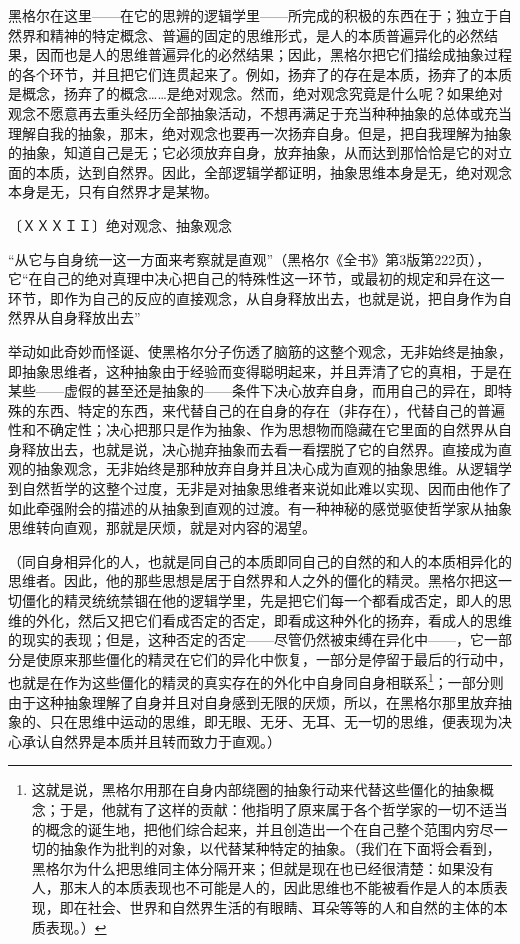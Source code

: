 \documentclass[a4paper,twoside,12pt]{ctexart}
\begin{document}
黑格尔在这里——在它的思辨的逻辑学里——所完成的积极的东西在于；独立于自然界和精神的特定概念、普遍的固定的思维形式，是人的本质普遍异化的必然结果，因而也是人的思维普遍异化的必然结果；因此，黑格尔把它们描绘成抽象过程的各个环节，并且把它们连贯起来了。例如，扬弃了的存在是本质，扬弃了的本质是概念，扬弃了的概念……是绝对观念。然而，绝对观念究竟是什么呢？如果绝对观念不愿意再去重头经历全部抽象活动，不想再满足于充当种种抽象的总体或充当理解自我的抽象，那末，绝对观念也要再一次扬弃自身。但是，把自我理解为抽象的抽象，知道自己是无；它必须放弃自身，放弃抽象，从而达到那恰恰是它的对立面的本质，达到自然界。因此，全部逻辑学都证明，抽象思维本身是无，绝对观念本身是无，只有自然界才是某物。

〔ＸＸＸＩＩ〕绝对观念、抽象观念

\begin{fangsong}
“从它与自身统一这一方面来考察就是直观”（黑格尔《全书》第3版第222页），它“在自己的绝对真理中决心把自己的特殊性这一环节，或最初的规定和异在这一环节，即作为自己的反应的直接观念，从自身释放出去，也就是说，把自身作为自然界从自身释放出去”
\end{fangsong}

举动如此奇妙而怪诞、使黑格尔分子伤透了脑筋的这整个观念，无非始终是抽象，即抽象思维者，这种抽象由于经验而变得聪明起来，并且弄清了它的真相，于是在某些——虚假的甚至还是抽象的——条件下决心放弃自身，而用自己的异在，即特殊的东西、特定的东西，来代替自己的在自身的存在（非存在），代替自己的普遍性和不确定性；决心把那只是作为抽象、作为思想物而隐藏在它里面的自然界从自身释放出去，也就是说，决心抛弃抽象而去看一看摆脱了它的自然界。直接成为直观的抽象观念，无非始终是那种放弃自身并且决心成为直观的抽象思维。从逻辑学到自然哲学的这整个过度，无非是对抽象思维者来说如此难以实现、因而由他作了如此牵强附会的描述的从抽象到直观的过渡。有一种神秘的感觉驱使哲学家从抽象思维转向直观，那就是厌烦，就是对内容的渴望。

（同自身相异化的人，也就是同自己的本质即同自己的自然的和人的本质相异化的思维者。因此，他的那些思想是居于自然界和人之外的僵化的精灵。黑格尔把这一切僵化的精灵统统禁锢在他的逻辑学里，先是把它们每一个都看成否定，即人的思维的外化，然后又把它们看成否定的否定，即看成这种外化的扬弃，看成人的思维的现实的表现；但是，这种否定的否定——尽管仍然被束缚在异化中——，它一部分是使原来那些僵化的精灵在它们的异化中恢复，一部分是停留于最后的行动中，也就是在作为这些僵化的精灵的真实存在的外化中自身同自身相联系\footnote{这就是说，黑格尔用那在自身内部绕圈的抽象行动来代替这些僵化的抽象概念；于是，他就有了这样的贡献：他指明了原来属于各个哲学家的一切不适当的概念的诞生地，把他们综合起来，并且创造出一个在自己整个范围内穷尽一切的抽象作为批判的对象，以代替某种特定的抽象。（我们在下面将会看到，黑格尔为什么把思维同主体分隔开来；但就是现在也已经很清楚：如果没有人，那末人的本质表现也不可能是人的，因此思维也不能被看作是人的本质表现，即在社会、世界和自然界生活的有眼睛、耳朵等等的人和自然的主体的本质表现。）
}；一部分则由于这种抽象理解了自身并且对自身感到无限的厌烦，所以，在黑格尔那里放弃抽象的、只在思维中运动的思维，即无眼、无牙、无耳、无一切的思维，便表现为决心承认自然界是本质并且转而致力于直观。）
\end{document}
